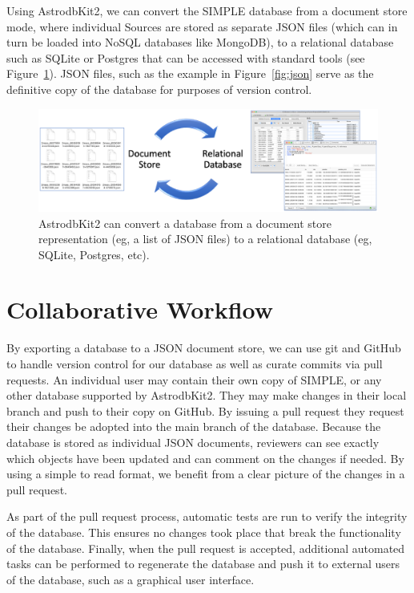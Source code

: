 \documentclass[11pt,twoside]{article}
\begin{document}
Using AstrodbKit2, we can convert the SIMPLE database from a document store mode, where individual Sources are stored as separate JSON files (which can in turn be loaded into NoSQL databases like MongoDB), to a relational database such as SQLite or Postgres that can be accessed with standard tools (see Figure~\ref{fig:astrodbkit2}). JSON files, such as the example in Figure~\ref{fig:json} serve as the definitive copy of the database for purposes of version control.

\begin{figure}
    \centering
    \includegraphics[width=\textwidth]{X0-012_f1.eps}
    \caption{AstrodbKit2 can convert a database from a document store representation (eg, a list of JSON files) to a relational database (eg, SQLite, Postgres, etc).}
    \label{fig:astrodbkit2}
\end{figure}

\section{Collaborative Workflow}

By exporting a database to a JSON document store, we can use git and GitHub to handle version control for our database as well as curate commits via pull requests. 
An individual user may contain their own copy of SIMPLE, or any other database supported by AstrodbKit2. They may make changes in their local branch and push to their copy on GitHub. By issuing a pull request they request their changes be adopted into the main branch of the database. Because the database is stored as individual JSON documents, reviewers can see exactly which objects have been updated and can comment on the changes if needed. By using a simple to read format, we benefit from a clear picture of the changes in a pull request. 

As part of the pull request process, automatic tests are run to verify the integrity of the database. This ensures no changes took place that break the functionality of the database. Finally, when the pull request is accepted, additional automated tasks can be performed to regenerate the database and push it to external users of the database, such as a graphical user interface.
\end{document}
